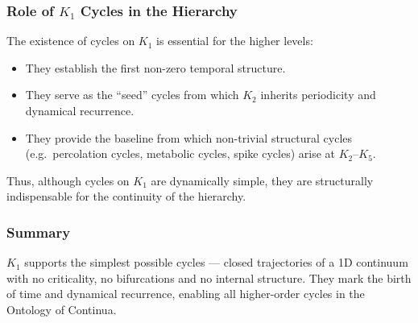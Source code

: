 \subsubsection{Role of \texorpdfstring{$K_1$}{K_1} Cycles in the Hierarchy}

The existence of cycles on $K_1$ is essential for the higher levels:

\begin{itemize}
  \item They establish the first non-zero temporal structure.
  \item They serve as the ``seed'' cycles from which $K_2$
        inherits periodicity and dynamical recurrence.
  \item They provide the baseline from which non-trivial structural
        cycles (e.g.\ percolation cycles, metabolic cycles, spike
        cycles) arise at $K_2$–$K_5$.
\end{itemize}

Thus, although cycles on $K_1$ are dynamically simple, they are
structurally indispensable for the continuity of the hierarchy.

\subsubsection{Summary}

$K_1$ supports the simplest possible cycles — closed trajectories of a
1D continuum with no criticality, no bifurcations and no internal
structure.
They mark the birth of time and dynamical recurrence, enabling all
higher-order cycles in the Ontology of Continua.
